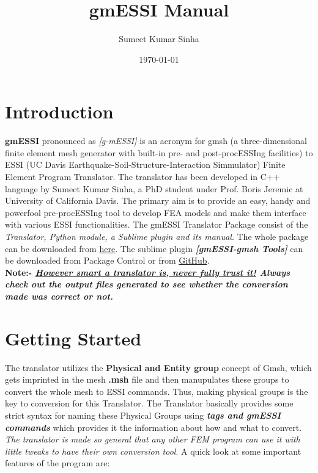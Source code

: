 \documentclass[11pt]{article}
\title{gmESSI Manual}
\author{Sumeet Kumar Sinha } %
\date{\today}
\begin{document}
\maketitle

\tableofcontents
\newpage



\section{Introduction} 


\textbf{gmESSI}  pronounced  as  \textit{[g-mESSI]}  is  an  acronym for gmsh (a
three-dimensional   finite   element  mesh  generator  with  built-in  pre-  and
post-procESSIng        facilities)        to        ESSI        (UC        Davis
Earthquake-Soil-Structure-Interaction   Simmulator)   Finite   Element   Program
Translator.  The  translator  has been developed in C++ language by Sumeet Kumar
Sinha,  a  PhD  student  under  Prof.  Boris Jeremic at University of California
Davis. The primary aim is to provide an easy, handy and powerfool pre-procESSIng
tool   to  develop  FEA  models  and  make  them  interface  with  various  ESSI
functionalities.    The    gmESSI    Translator    Package    consist   of   the
\textit{Translator,  Python  module, a Sublime plugin and its manual}. The whole
package  can be downloaded from \href{https://github.com/SumeetSinha/gmESSI}
{here}. The sublime plugin  \textit{\textbf{[gmESSI-gmsh Tools]}} can   be   
downloaded   from  Package  Control  or  from
\href{https://github.com/SumeetSinha/gmESSI-SublimePlugin}{GitHub}.\\ 

\textbf{Note:-  \textit{\underline{However  smart  a translator is, never fully
trust it!} Always  check  out the output files generated to see whether the
conversion made was correct or not.}}


\section{Getting Started} 

The  translator utilizes the \textbf{Physical and Entity group} concept of Gmsh,
which  gets  imprinted in the mesh \textbf{.msh} file and then manupulates these
groups  to convert the whole mesh to ESSI commands. Thus, making physical groups
is  the key to conversion for this Translator. The Translator basically provides
some  strict  syntax for naming these Physical Groups using \textbf{\textit{tags
and  gmESSI  commands}}  which provides it the information about how and what to
convert.  \textit{The  translator  is made so general that any other FEM program
can  use  it with little tweaks to have their own conversion tool}. A quick look
at some important features of the program are:
\end{document}
